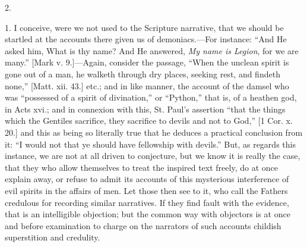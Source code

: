 2.

1. I conceive, were we not used to the Scripture narrative, that we
should be startled at the accounts there given us of demoniacs.—For
instance: ``And He asked him, What is thy name? And He answered, \emph{My
name is Legion}, for we are many.'' [Mark v. 9.]—Again,
consider the passage, ``When the unclean spirit is gone out of a
man, he walketh through dry places, seeking rest, and findeth
none,'' [Matt. xii. 43.] etc.; and in like manner, the account of
the damsel who was ``possessed of a spirit of divination,'' or
``Python,'' that is, of a heathen god, in Acts xvi.; and in
connexion with this, St. Paul's assertion ``that the things which
the Gentiles sacrifice, they sacrifice to devils and not to God,''
[1 Cor. x. 20.] and this as being so literally true that he deduces a
practical conclusion from it: ``I would not that ye should have
fellowship with devils.'' But, as regards this instance, we are
not at all driven to conjecture, but we know it is really the case,
that they who allow themselves to treat the inspired text freely, do
at once explain away, or refuse to admit its accounts of this
mysterious interference of evil spirits in the affairs of men. Let
those then see to it, who call the Fathers credulous for recording
similar narratives. If they find fault with the evidence, that is an
intelligible objection; but the common way with objectors is at once
and before examination to charge on the narrators of such accounts
childish superstition and credulity.

